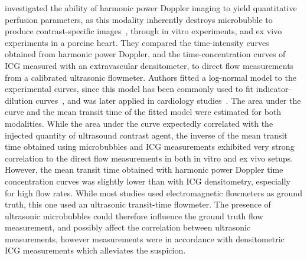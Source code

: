 \citet{Tiemann:2000wl} investigated the ability of harmonic power Doppler imaging to yield quantitative perfusion parameters, as this modality inherently destroys microbubble to produce contrast-specific images~\cite{Tiemann:1997vj}, through in vitro experiments, and ex vivo experiments in a porcine heart.
They compared the time-intensity curves obtained from harmonic power Doppler, and the time-concentration curves of ICG measured with an extravascular densitometer, to direct flow measurements from a calibrated ultrasonic flowmeter. 
Authors fitted a log-normal model to the experimental curves, since this model has been commonly used to fit indicator-dilution curves~\cite{Stow:1954ty,Wise:1966ji},
and was later applied in cardiology studies~\cite{Linton:1995ij,Band:1997ib}.
The area under the curve and the mean transit time of the fitted model were estimated for both modalities. 
While the area under the curve expectedly correlated with the injected quantity of ultrasound contrast agent, the inverse of the mean transit time obtained using microbubbles and ICG measurements exhibited very strong correlation to the direct flow measurements in both in vitro and ex vivo setups.
However, the mean transit time obtained with harmonic power Doppler time concentration curves was slightly lower than with ICG densitometry, especially for high flow rates.
While most studies used electromagnetic flowmeters as ground truth, this one used an ultrasonic transit-time flowmeter. 
The presence of ultrasonic microbubbles could therefore influence the ground truth flow measurement, and possibly affect the correlation between ultrasonic measurements, however measurements were in accordance with densitometric ICG measurements which alleviates the suspicion.

